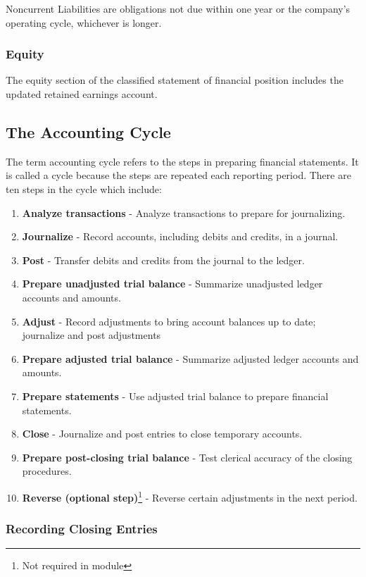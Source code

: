 \documentclass[../main.tex]{subfiles}
\begin{document}
	Noncurrent Liabilities are obligations not due within one year or the 
	company's operating cycle, whichever is longer. 
	
	\subsubsection{Equity}
	
	The equity section of the classified statement of financial position 
	includes the updated retained earnings account.
	
	\subsection{The Accounting Cycle}
	The term accounting cycle refers to the steps in preparing financial 
	statements. It is called a cycle because the steps are repeated each 
	reporting period. There are ten steps in the cycle which include:
	\begin{enumerate}[noitemsep]
		\item \textbf{Analyze transactions} - Analyze transactions to prepare 
		for 
		journalizing.
		\item \textbf{Journalize} - Record accounts, including debits and 
		credits, in a journal.
		\item \textbf{Post} - Transfer debits and credits from the journal to 
		the ledger.
		\item \textbf{Prepare unadjusted trial balance} - Summarize unadjusted 
		ledger accounts and amounts.
		\item \textbf{Adjust} - Record adjustments to bring account balances 
		up to date; journalize and post adjustments
		\item \textbf{Prepare adjusted trial balance} - Summarize adjusted 
		ledger accounts and amounts.
		\item \textbf{Prepare statements} - Use adjusted trial balance to 
		prepare financial statements.
		\item \textbf{Close} - Journalize and post entries to close temporary 
		accounts.
		\item \textbf{Prepare post-closing trial balance} - Test clerical 
		accuracy of the closing procedures.
		\item \textbf{Reverse (optional step)}\footnote{Not required in module} 
		- Reverse certain adjustments 
		in the next period. 
	\end{enumerate}

	\subsubsection{Recording Closing Entries}
	
\end{document}
